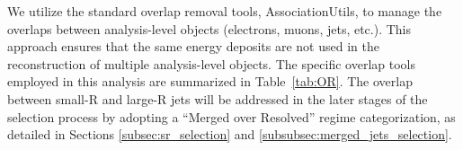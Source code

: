 
We utilize the standard overlap removal tools, AssociationUtils, to manage the overlaps between analysis-level objects (electrons, muons, jets, etc.). This approach ensures that the same energy deposits are not used in the reconstruction of multiple analysis-level objects. The specific overlap tools employed in this analysis are summarized in Table~\ref{tab:OR}.
The overlap between small-R and large-R jets will be addressed in the later stages of the selection process by adopting a ``Merged over Resolved'' regime categorization, as detailed in Sections \ref{subsec:sr_selection} and \ref{subsubsec:merged_jets_selection}.


